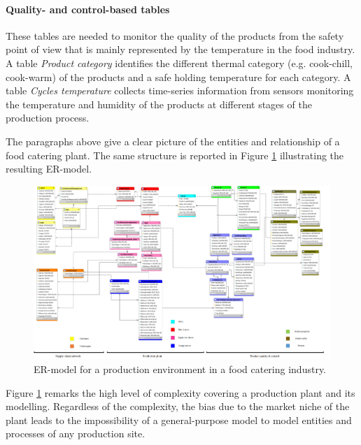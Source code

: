 \paragraph{Quality- and control-based tables}
These tables are needed to monitor the quality of the products from the safety point of view that is mainly represented by the temperature in the food industry. A table \textit{Product category} identifies the different thermal category (e.g. cook-chill, cook-warm) of the products and a safe holding temperature for each category. A table \textit{Cycles temperature} collects time-series information from sensors monitoring the temperature and humidity of the products at different stages of the production process.\par

The paragraphs above give a clear picture of the entities and relationship of a food catering plant. The same structure is reported in Figure \ref{fig_prod_er_diagram} illustrating the resulting ER-model. 

\begin{landscape}
\thispagestyle{empty}
\begin{figure}[hbt!]
\centering
\includegraphics[width=1.6\textwidth]{sectionProduction/diagnosticModels_figures/fig_prod_er_diagram.png}
\captionsetup{type=table}
\caption{ER-model for a production environment in a food catering industry.}
\label{fig_prod_er_diagram}
\end{figure}
\end{landscape}

Figure \ref{fig_prod_er_diagram} remarks the high level of complexity covering a production plant and its modelling. Regardless of the complexity, the bias due to the market niche of the plant leads to the impossibility of a general-purpose model to model entities and processes of any production site. \par

